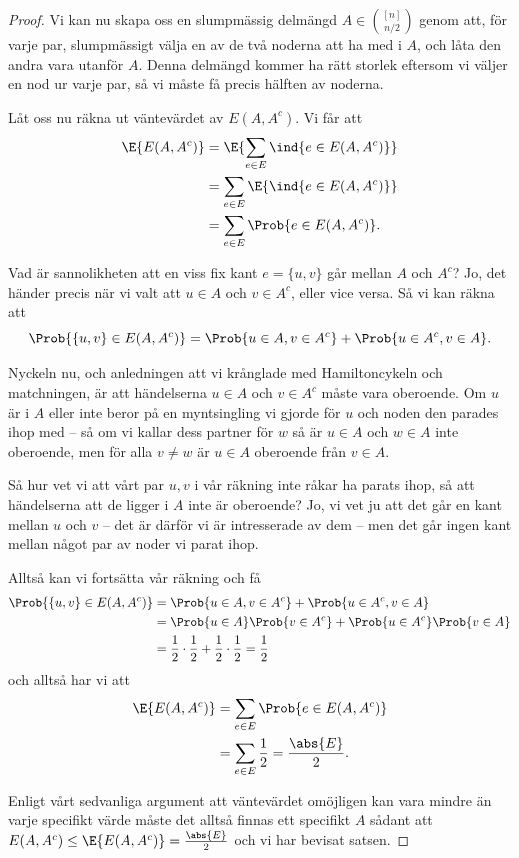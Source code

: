 \documentclass[nobib]{tufte-handout}
\begin{document}
\begin{proposition}
\begin{proof}
    Vi kan nu skapa oss en slumpmässig delmängd $A \in \binom{[n]}{n/2}$ genom att, för varje par, slumpmässigt välja en av de två noderna att ha med i $A$, och låta den andra vara utanför $A$. Denna delmängd kommer ha rätt storlek eftersom vi väljer en nod ur varje par, så vi måste få precis hälften av noderna.

    Låt oss nu räkna ut väntevärdet av $E(A, A^c)$. Vi får att
    \begin{align*}
      \E{E(A, A^c)} &= \E{\sum_{e \in E} \ind{e \in E(A, A^c)}}\\
      &= \sum_{e \in E} \E{\ind{e \in E(A, A^c)}}\\
      &= \sum_{e \in E} \Prob{e \in E(A, A^c)}.
    \end{align*}

    Vad är sannolikheten att en viss fix kant $e = \{u, v\}$ går mellan $A$ och $A^c$? Jo, det händer precis när vi valt att $u \in A$ och $v \in A^c$, eller vice versa. Så vi kan räkna att
    $$\Prob{\{u,v\} \in E(A, A^c)} = \Prob{u \in A, v \in A^c} + \Prob{u \in A^c, v \in A}.$$
    
    Nyckeln nu, och anledningen att vi krånglade med Hamiltoncykeln och matchningen, är att händelserna $u\in A$ och $v\in A^c$ måste vara oberoende. Om $u$ är i $A$ eller inte beror på en myntsingling vi gjorde för $u$ och noden den parades ihop med -- så om vi kallar dess partner för $w$ så är $u \in A$ och $w \in A$ inte oberoende, men för alla $v \neq w$ är $u \in A$ oberoende från $v \in A$.

    Så hur vet vi att vårt par $u, v$ i vår räkning inte råkar ha parats ihop, så att händelserna att de ligger i $A$ inte är oberoende? Jo, vi vet ju att det går en kant mellan $u$ och $v$ -- det är därför vi är intresserade av dem -- men det går ingen kant mellan något par av noder vi parat ihop.

    Alltså kan vi fortsätta vår räkning och få
    \begin{align*}
      \Prob{\{u,v\} \in E(A, A^c)} &= \Prob{u \in A, v \in A^c} + \Prob{u \in A^c, v \in A}\\
      &= \Prob{u \in A}\Prob{v \in A^c} + \Prob{u \in A^c}\Prob{v \in A}\\
      &= \frac{1}{2}\cdot\frac{1}{2} + \frac{1}{2}\cdot\frac{1}{2} = \frac{1}{2}
    \end{align*}
    och alltså har vi att
    \begin{align*}
      \E{E(A,A^c)} &= \sum_{e \in E} \Prob{e \in E(A, A^c)}\\
      &= \sum_{e \in E} \frac{1}{2} = \frac{\abs{E}}{2}.
    \end{align*}

    Enligt vårt sedvanliga argument att väntevärdet omöjligen kan vara mindre än varje specifikt värde måste det alltså finnas ett specifikt $A$ sådant att $E(A, A^c) \leq \E{E(A,A^c)} = \frac{\abs{E}}{2}$ och vi har bevisat satsen.
  \end{proof}
\end{proposition}
\end{document}
